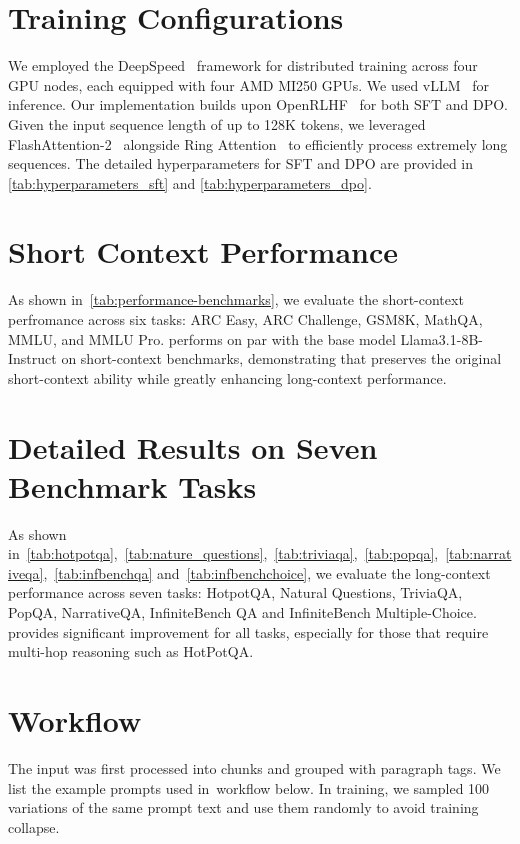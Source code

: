 
\section{Training Configurations}
\label{asec:hyperparameters}
We employed the DeepSpeed~\cite{rasley2020deepspeed} framework for distributed training across four GPU nodes, each equipped with four AMD MI250 GPUs. 
We used vLLM~\cite{kwon2023efficient} for inference.
Our implementation builds upon OpenRLHF~\cite{hu2024openrlhf} for both SFT and DPO. 
Given the input sequence length of up to 128K tokens, we leveraged FlashAttention-2~\cite{dao2023flashattention} alongside Ring Attention~\cite{liu2023ring} to efficiently process extremely long sequences. 
The detailed hyperparameters for SFT and DPO are provided in \cref{tab:hyperparameters_sft} and \cref{tab:hyperparameters_dpo}.



\section{Short Context Performance}
\label{asec:short_context}


As shown in~\cref{tab:performance-benchmarks}, we evaluate the short-context perfromance across six tasks: ARC Easy, ARC Challenge, GSM8K, MathQA, MMLU, and MMLU Pro. \method performs on par with the base model Llama3.1-8B-Instruct on short-context benchmarks, demonstrating that \method preserves the original short-context ability while greatly enhancing long-context performance.

\section{Detailed Results on Seven Benchmark Tasks}
As shown in~\cref{tab:hotpotqa},~\cref{tab:nature_questions},~\cref{tab:triviaqa},~\cref{tab:popqa},~\cref{tab:narrativeqa},~\cref{tab:infbenchqa} and~\cref{tab:infbenchchoice}, we evaluate the long-context performance across seven tasks: HotpotQA, Natural Questions, TriviaQA, PopQA, NarrativeQA, InfiniteBench QA and InfiniteBench Multiple-Choice. 
\method provides significant improvement for all tasks, especially for those that require multi-hop reasoning such as HotPotQA.



\section{\coclong Workflow}
The input was first processed into chunks and grouped with paragraph tags.
We list the example prompts used in~\method workflow below. In training, we sampled 100 variations of the same prompt text and use them randomly to avoid training collapse.

